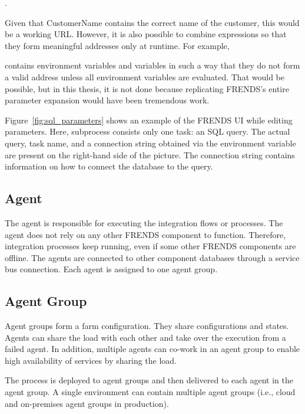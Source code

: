 \documentclass[english, 12pt, a4paper, sci, utf8, a-2b, online, obeyspaces]{aaltothesis}
\begin{document}
\nopagebreak
\begin{center}
.
\end{center}

Given that CustomerName contains the correct name of the customer, this would be a working URL. However, it is also possible to combine expressions so that they form meaningful addresses only at runtime. For example,

\nopagebreak
\begin{center}
\end{center}
contains environment variables and variables in such a way that they do not form a valid address unless all environment variables are evaluated. That would be possible, but in this thesis, it is not done because replicating FRENDS’s entire parameter expansion would have been tremendous work.

Figure~\ref{fig:sql_parameters} shows an example of the FRENDS UI while editing parameters. Here, subprocess consists only one task: an SQL query. The actual query, task name, and a connection string obtained via the environment variable are present on the right-hand side of the picture. The connection string contains information on how to connect the database to the query. 

\subsection{Agent}
The agent is responsible for executing the integration flows or processes. The agent does not rely on any other FRENDS component to function. Therefore, integration processes keep running, even if some other FRENDS components are offline. The agents are connected to other component databases through a service bus connection. Each agent is assigned to one agent group. 

\subsection{Agent Group}
Agent groups form a farm configuration. They share configurations and states. Agents can share the load with each other and take over the execution from a failed agent. In addition, multiple agents can co-work in an agent group to enable high availability of services by sharing the load.

The process is deployed to agent groups and then delivered to each agent in the agent group. A single environment can contain multiple agent groups (i.e., cloud and on-premises agent groups in production).
\end{document}
